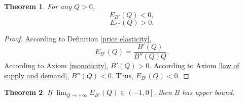 \documentclass{article}
\newtheorem{theorem}{Theorem}
\begin{document}
\begin{theorem}
\label{sign of price elasticity}
For any $Q>0$,
$$E_{B'}\left(Q\right)<0,$$
$$E_{C'}\left(Q\right)>0.$$
\end{theorem}
\begin{proof}
According to Definition \ref{price elasticity},
$$E_{B'}\left(Q\right)=\frac{B'\left(Q\right)}{B''\left(Q\right)Q}.$$
According to Axiom \ref{monoticity}, $B'\left(Q\right)>0$.
According to Axiom \ref{law of supply and demand}, $B''\left(Q\right)<0$.
Thus, $E_{B'}\left(Q\right)<0$.
\end{proof}

\begin{theorem}
\label{upper bound of benefit}
If $\lim_{Q\to+\infty}E_{B'}\left(Q\right)\in\left(-1,0\right]$, then $B$ has upper bound.
\end{theorem}
\end{document}
